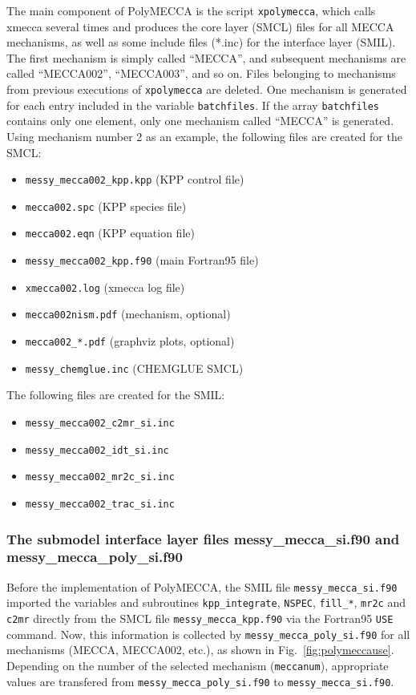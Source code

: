 \documentclass[a4paper,twoside]{article}
\begin{document}
The main component of PolyMECCA is the script \verb|xpolymecca|, which
calls xmecca several times and produces the core layer (SMCL) files for
all MECCA mechanisms, as well as some include files (*.inc) for the
interface layer (SMIL). The first mechanism is simply called ``MECCA'',
and subsequent mechanisms are called ``MECCA002'', ``MECCA003'', and so
on. Files belonging to mechanisms from previous executions of
\verb|xpolymecca| are deleted. One mechanism is generated for each entry
included in the variable \verb|batchfiles|. If the array
\verb|batchfiles| contains only one element, only one mechanism called
``MECCA'' is generated. Using mechanism number 2 as an example, the
following files are created for the SMCL:
\begin{itemize}
\item \verb|messy_mecca002_kpp.kpp| \hfill (KPP control file)
\item \verb|mecca002.spc|           \hfill (KPP species file)
\item \verb|mecca002.eqn|           \hfill (KPP equation file)
\item \verb|messy_mecca002_kpp.f90| \hfill (main Fortran95 file)
\item \verb|xmecca002.log|          \hfill (xmecca log file)
\item \verb|mecca002nism.pdf|       \hfill (mechanism, optional)
\item \verb|mecca002_*.pdf|         \hfill (graphviz plots, optional)
\item \verb|messy_chemglue.inc|     \hfill (CHEMGLUE SMCL)
\end{itemize}
The following files are created for the SMIL:
\begin{itemize}
\item \verb|messy_mecca002_c2mr_si.inc|
\item \verb|messy_mecca002_idt_si.inc|
\item \verb|messy_mecca002_mr2c_si.inc|
\item \verb|messy_mecca002_trac_si.inc|
\end{itemize}

\subsubsection{The submodel interface layer files messy\_mecca\_si.f90
  and messy\_mecca\_poly\_si.f90}

Before the implementation of PolyMECCA, the SMIL file
\verb|messy_mecca_si.f90| imported the variables and subroutines
\verb|kpp_integrate|, \verb|NSPEC|, \verb|fill_*|, \verb|mr2c| and
\verb|c2mr| directly from the SMCL file \verb|messy_mecca_kpp.f90| via
the Fortran95 \verb|USE| command. Now, this information is collected by
\verb|messy_mecca_poly_si.f90| for all mechanisms (MECCA, MECCA002,
etc.), as shown in Fig.~\ref{fig:polymeccause}. Depending on the number
of the selected mechanism (\verb|meccanum|), appropriate values are
transfered from \verb|messy_mecca_poly_si.f90| to
\verb|messy_mecca_si.f90|.
\end{document}
